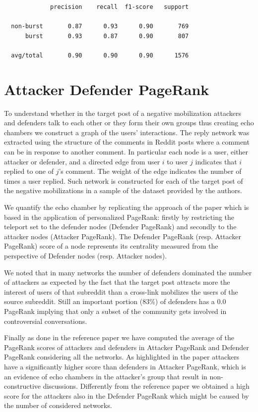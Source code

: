 \documentclass{article}
\begin{document}
\begin{verbatim}
             precision    recall  f1-score   support

  non-burst       0.87      0.93      0.90       769
      burst       0.93      0.87      0.90       807

  avg/total       0.90      0.90      0.90      1576
\end{verbatim}

\section{Attacker Defender PageRank}

To understand whether in the target post of a negative mobilization attackers
and defenders talk to each other or they form their own groups thus creating
echo chambers we construct a graph of the users' interactions. The reply network
was extracted using the structure of the comments in Reddit posts where a
comment can be in response to another comment. In particular each node is a user,
either attacker or defender, and a directed edge from user $i$ to user $j$
indicates that $i$ replied to one of $j$'s comment. The weight of the edge
indicates the number of times a user replied. Such network is constructed for
each of the target post of the negative mobilizations in a sample of the dataset
provided by the authors.

We quantify the echo chamber by replicating the approach of the paper which is
based in the application of personalized PageRank: firstly by restricting the
teleport set to the defender nodes (Defender PageRank) and secondly to the
attacker nodes (Attacker PageRank). The Defender PageRank (resp. Attacker
PageRank) score of a node represents its centrality measured from the perspective
of Defender nodes (resp. Attacker nodes).

We noted that in many networks the number of defenders dominated the number of
attackers as expected by the fact that the target post attracts more the
interest of users of that subreddit than a cross-link mobilizes the users of the
source subreddit. Still an important portion (83\%) of defenders has a 0.0 PageRank
implying that only a subset of the community gets involved in controversial
conversations.

Finally as done in the reference paper we have computed the average of the
PageRank scores of attackers and defenders in Attacker PageRank and Defender
PageRank considering all the networks. As highlighted in the paper
attackers have a significantly higher score than defenders in Attacker PageRank,
which is an evidence of echo chambers in the attacker's group that result in
non-constructive discussions. Differently from the reference paper we obtained a
high score for the attackers also in the Defender PageRank which might be caused
by the number of considered networks.
\end{document}
